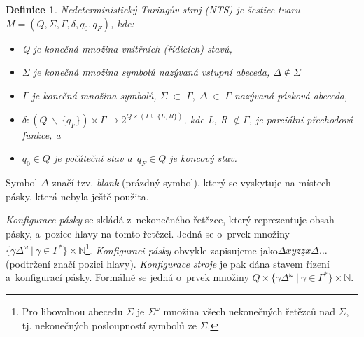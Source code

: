 \documentclass[twocolumn, a4paper, 11pt]{article}
\newtheorem{Def}{Definice}
\begin{document}
    \begin{Def}
        \textup{Nedeterministický Turingův stroj} (NTS) je šestice tvaru ${M=(Q,\Sigma,\Gamma,\delta,q_0,q_F)}$, kde:
    \begin{itemize}
        \item Q je konečná množina \textup{vnitřních (řídicích) stavů},
        
        \item ${\Sigma}$ je konečná množina symbolů nazývaná \textup{vstupní abeceda}, ${\Delta \notin \Sigma}$
        
        \item ${\Gamma}$ je konečná množina symbolů, ${\Sigma \; \subset \; \Gamma, \; \Delta \; \in \; \Gamma}$ nazývaná \textup{pásková abeceda},
        
        \item ${\delta : (Q\:\backslash\:\{q_F\}) \times \Gamma \rightarrow 2^{Q\times(\Gamma \cup \{L,R\})}}$, kde L, R ${\notin \Gamma}$, je parciální \textup{přechodová funkce}, a
        
        \item ${q_0 \in Q}$ je \textup{počáteční stav} a~${q_F \in Q}$ je \textup{koncový stav}.
    \end{itemize}
    \end{Def}
    
    Symbol ${\Delta}$ značí tzv. \emph{blank} (prázdný symbol), který se vyskytuje na místech pásky, která nebyla ještě použita.
    
    \emph{Konfigurace pásky} se skládá z~nekonečného řetězce, který reprezentuje obsah pásky, a~pozice hlavy na tomto řetězci. Jedná se o~prvek množiny ${\{\gamma \Delta^\omega \:|\: \gamma \in \Gamma^*\} \times \mathbb{N}}$\footnote{Pro libovolnou abecedu ${\Sigma}$ je ${\Sigma^\omega}$ množina všech nekonečných řetězců nad $\Sigma$, tj. nekonečných posloupností symbolů ze ${\Sigma}$.}.
    \emph{Konfiguraci pásky} obvykle zapisujeme jako${\Delta xyz\underline{z}x\Delta \dots}$ (podtržení značí pozici hlavy).
    \emph{Konfigurace stroje} je pak dána stavem řízení a~konfigurací pásky. Formálně se jedná o~prvek množiny ${Q \times \{\gamma \Delta^\omega \:|\: \gamma \in \Gamma^*\} \times \mathbb{N}}$.
    
\end{document}

